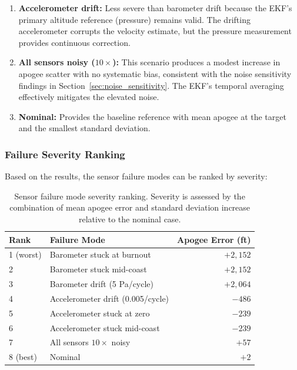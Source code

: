 \documentclass[11pt,letterpaper]{article}
\begin{document}
\begin{enumerate}[nosep]
    \item \textbf{Accelerometer drift:} Less severe than barometer drift because the EKF's primary altitude reference (pressure) remains valid. The drifting accelerometer corrupts the velocity estimate, but the pressure measurement provides continuous correction.

    \item \textbf{All sensors noisy ($10\times$):} This scenario produces a modest increase in apogee scatter with no systematic bias, consistent with the noise sensitivity findings in Section~\ref{sec:noise_sensitivity}. The EKF's temporal averaging effectively mitigates the elevated noise.

    \item \textbf{Nominal:} Provides the baseline reference with mean apogee at the target and the smallest standard deviation.
\end{enumerate}

\subsubsection{Failure Severity Ranking}

Based on the results, the sensor failure modes can be ranked by severity:

\begin{table}[H]
    \centering
    \caption{Sensor failure mode severity ranking. Severity is assessed by the combination of mean apogee error and standard deviation increase relative to the nominal case.}
    \label{tab:sensor_failure_ranking}
    \begin{tabular}{llr}
        \toprule
        \textbf{Rank} & \textbf{Failure Mode} & \textbf{Apogee Error (ft)} \\
        \midrule
        1 (worst) & Barometer stuck at burnout & $+2{,}152$ \\
        2 & Barometer stuck mid-coast & $+2{,}152$ \\
        3 & Barometer drift (5 Pa/cycle) & $+2{,}064$ \\
        4 & Accelerometer drift (0.005/cycle) & $-486$ \\
        5 & Accelerometer stuck at zero & $-239$ \\
        6 & Accelerometer stuck mid-coast & $-239$ \\
        7 & All sensors $10\times$ noisy & $+57$ \\
        8 (best) & Nominal & $+2$ \\
        \bottomrule
    \end{tabular}
\end{table}
\end{document}
